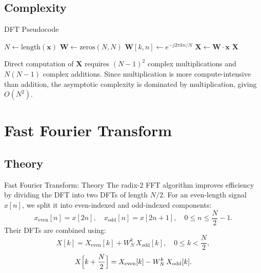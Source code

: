 \documentclass[10pt]{beamer}
\begin{document}
\subsection{Complexity}
\begin{frame}[fragile]{DFT Pseudocode}
\begin{algorithm}[H]
\caption{DFT}
\begin{algorithmic}[1]
  \State \(N \gets \text{length}(\bm{x})\)
  \State \(\bm{W} \gets \text{zeros}(N,N)\) 
      \State \(\bm{W}[k,n] \gets e^{-j2\pi kn/N}\)
    \EndFor
  \EndFor
  \State \(\bm{X} \gets \bm{W} \cdot \bm{x}\) 
  \State \Return \(\bm{X}\)
\EndFunction
\end{algorithmic}
\end{algorithm}
Direct computation of $\bm{X}$ requires $(N-1)^2$ complex multiplications and $N(N-1)$ complex additions. Since multiplication is more compute-intensive than addition, the asymptotic complexity is dominated by multiplication, giving $O(N^2)$.
\end{frame}

\section{Fast Fourier Transform}

\subsection{Theory}
\begin{frame}{Fast Fourier Transform: Theory}
  The radix-2 FFT algorithm improves efficiency by dividing the DFT into two DFTs of length \(N/2\). For an even-length signal \(x[n]\), we split it into even-indexed and odd-indexed components:
  \[
  x_{\text{even}}[n] = x[2n], \quad x_{\text{odd}}[n] = x[2n+1], \quad 0 \le n \le \frac{N}{2}-1.
  \]
  Their DFTs are combined using:
  \[
  X[k] = X_{\text{even}}[k] + W_N^k\, X_{\text{odd}}[k], \quad 0 \le k < \frac{N}{2},
  \]
  \[
  X\Bigl[k+\frac{N}{2}\Bigr] = X_{\text{even}}[k] - W_N^k\, X_{\text{odd}}[k].
  \]
\end{frame}
\end{document}
